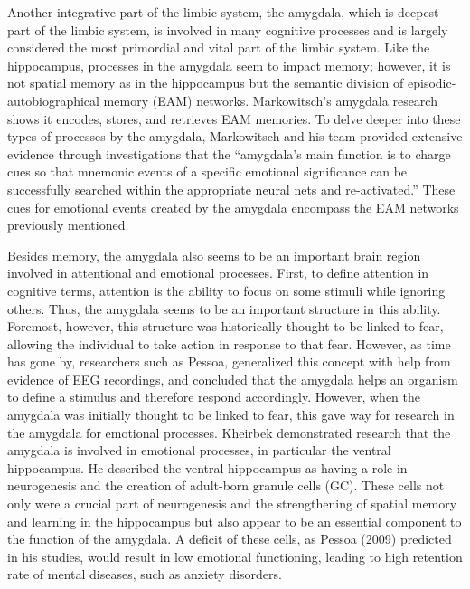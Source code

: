 Another integrative part of the limbic system, the amygdala, which is deepest part of the limbic system, is involved in many cognitive processes and is largely considered the most primordial and vital part of the limbic system. Like the hippocampus, processes in the amygdala seem to impact memory; however, it is not spatial memory as in the hippocampus but the semantic division of episodic-autobiographical memory (EAM) networks. Markowitsch's amygdala research shows it encodes, stores, and retrieves EAM memories. To delve deeper into these types of processes by the amygdala, Markowitsch and his team provided extensive evidence through investigations that the ``amygdala's main function is to charge cues so that mnemonic events of a specific emotional significance can be successfully searched within the appropriate neural nets and re-activated.'' These cues for emotional events created by the amygdala encompass the EAM networks previously mentioned.

Besides memory, the amygdala also seems to be an important brain region involved in attentional and emotional processes. First, to define attention in cognitive terms, attention is the ability to focus on some stimuli while ignoring others. Thus, the amygdala seems to be an important structure in this ability. Foremost, however, this structure was historically thought to be linked to fear, allowing the individual to take action in response to that fear. However, as time has gone by, researchers such as Pessoa, generalized this concept with help from evidence of EEG recordings, and concluded that the amygdala helps an organism to define a stimulus and therefore respond accordingly. However, when the amygdala was initially thought to be linked to fear, this gave way for research in the amygdala for emotional processes. Kheirbek demonstrated research that the amygdala is involved in emotional processes, in particular the ventral hippocampus. He described the ventral hippocampus as having a role in neurogenesis and the creation of adult-born granule cells (GC). These cells not only were a crucial part of neurogenesis and the strengthening of spatial memory and learning in the hippocampus but also appear to be an essential component to the function of the amygdala. A deficit of these cells, as Pessoa (2009) predicted in his studies, would result in low emotional functioning, leading to high retention rate of mental diseases, such as anxiety disorders.

